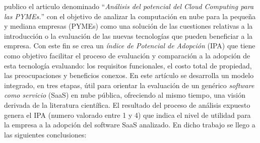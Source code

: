 \cite{ercolani} publico el articulo denominado ``\emph{Análisis del potencial del
Cloud Computing para las PYMEs.}'' con el objetivo de analizar la computación en nube
para la pequeña y mediana empresas (PYMEs) como una solución de las cuestiones relativas a la
introducción o la evaluación de las nuevas tecnologías que pueden beneficiar a la empresa.
Con este fin se crea un \emph{índice de Potencial de Adopción} (IPA) que tiene
como objetivo facilitar el proceso de evaluación y comparación a la adopción de
esta tecnología evaluando: los requisitos funcionales, el costo total de propiedad,
las preocupaciones y beneficios conexos.
En este artículo se desarrolla un modelo integrado, en tres etapas, útil para
orientar la evaluación de un genérico \emph{software como servicio} (SaaS) en nube
pública, ofreciendo al mismo tiempo, una visión derivada de la literatura científica.
El resultado del proceso de análisis expuesto genera el IPA (numero valorado
entre 1 y 4) que indica el nivel de utilidad para la empresa a la adopción del
software SaaS analizado. En dicho trabajo se llego a las siguientes conclusiones:
